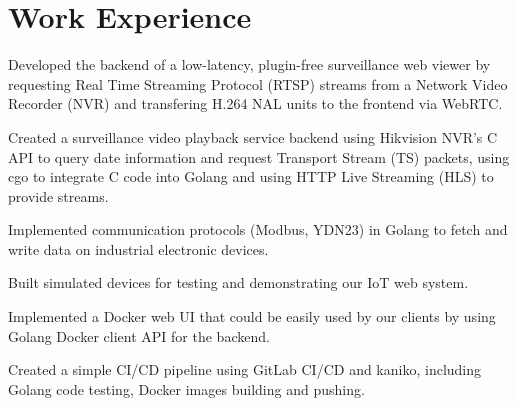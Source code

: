 \documentclass[]{deedy-resume}
\begin{document}
\begin{minipage}[t]{0.66\textwidth} 

\section{Work Experience}

\vspace{\topsep} %
\begin{tightemize}
\item Developed the backend of a low-latency, plugin-free surveillance web viewer
by requesting Real Time Streaming Protocol (RTSP) streams from a Network Video Recorder (NVR) and transfering H.264 NAL units to the frontend via WebRTC.
\item Created a surveillance video playback service backend using Hikvision NVR's C API to query date information and request Transport Stream (TS) packets,
using cgo to integrate C code into Golang and using HTTP Live Streaming (HLS) to provide streams.
\item Implemented communication protocols (Modbus, YDN23) in Golang to fetch and write data on industrial electronic devices.
\item Built simulated devices for testing and demonstrating our IoT web system.
\item Implemented a Docker web UI that could be easily used by our clients
by using Golang Docker client API for the backend.
\item Created a simple CI/CD pipeline using GitLab CI/CD and kaniko, including Golang code testing, Docker images building and pushing.
\end{tightemize}
\sectionsep


\end{minipage}
\end{document}
